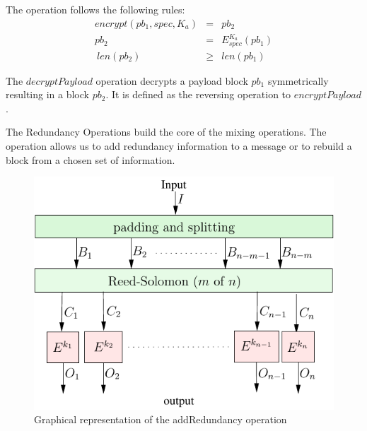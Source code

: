 \documentclass[acmsmall, screen, final]{acmart}
\begin{document}
	The operation follows the following rules:
	\begin{eqnarray}
	encrypt(pb_1, spec, K_a) & = & pb_2 \\
	pb_2 & = & E_{spec}^{K_a}\left( pb_1 \right)\\\
	len(pb_2) & \geq & len(pb_1)
	\end{eqnarray}
	
	
	The $decryptPayload$ operation decrypts a payload block $pb_1$ symmetrically resulting in a block $pb_2$. It is defined as the reversing operation to $encryptPayload$. 
	
	
	The Redundancy Operations build the core of the mixing operations. The operation allows us to add redundancy information to a message or to rebuild a block from a chosen set of information. 
	
	\begin{figure}[ht]\centering
		\includegraphics[width=0.5\columnwidth]{addRedundancyOp}
		\caption{Graphical representation of the addRedundancy operation}
		\label{fig:addRedundancyOperation}
	\end{figure}
	
\end{document}
